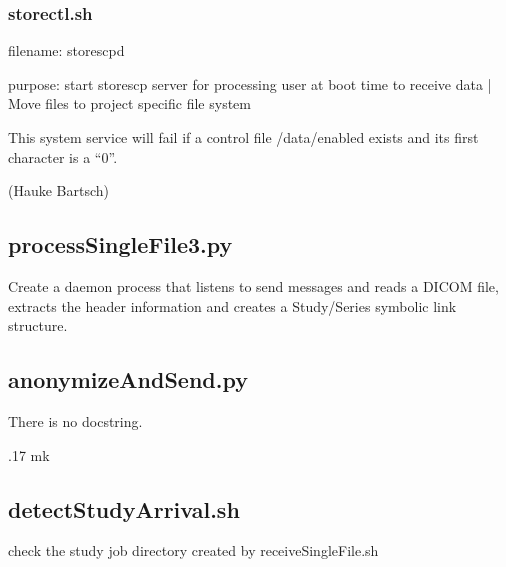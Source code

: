 \documentclass[letterpaper,10pt,english]{sphinxmanual}
\begin{document}
\subsubsection{storectl.sh}
\label{\detokenize{Architecture/scripts/storectl:storectl-sh}}
\sphinxAtStartPar
filename: storescpd

\sphinxAtStartPar
purpose: start storescp server for processing user at boot time to receive data
|         Move files to project specific file system

\sphinxAtStartPar
This system service will fail if a control file /data/enabled exists and  its first character is a “0”.

\sphinxAtStartPar
(Hauke Bartsch)

\sphinxstepscope


\subsection{processSingleFile3.py}
\label{\detokenize{Architecture/scripts/processSingleFile3:processsinglefile3-py}}\label{\detokenize{Architecture/scripts/processSingleFile3::doc}}
\sphinxAtStartPar
Create a daemon process that listens to send messages and reads a DICOM file,
extracts the header information and creates a Study/Series symbolic link structure.
\begin{description}
\sphinxAtStartPar
{}

\end{description}

\sphinxstepscope


\subsection{anonymizeAndSend.py}
\label{\detokenize{Architecture/scripts/anonymizeAndSend:anonymizeandsend-py}}\label{\detokenize{Architecture/scripts/anonymizeAndSend::doc}}
\sphinxAtStartPar
There is no docstring.

.17 mk

\sphinxstepscope


\subsection{detectStudyArrival.sh}
\label{\detokenize{Architecture/scripts/detectStudyArrival:detectstudyarrival-sh}}\label{\detokenize{Architecture/scripts/detectStudyArrival::doc}}
\sphinxAtStartPar
check the study job directory created by receiveSingleFile.sh
\end{document}
